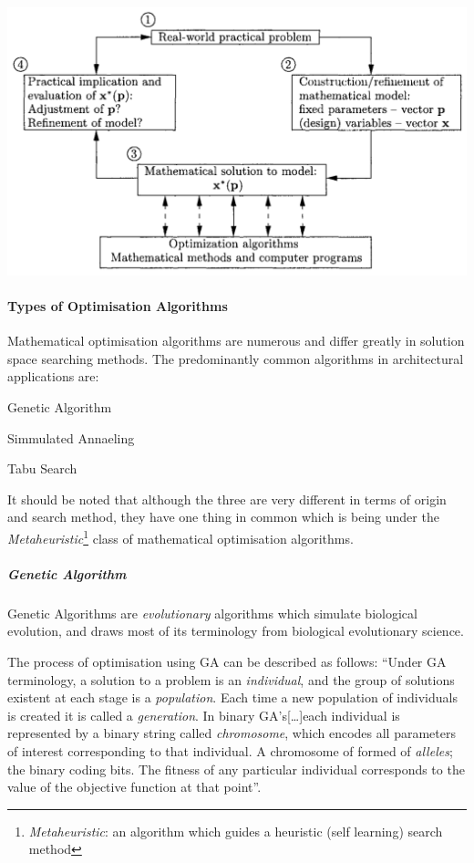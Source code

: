 \documentclass[11pt,a4paper,oneside]{article}
\newenvironment{Figure}		%
	{\par\medskip\noindent\minipage{\linewidth}}
	{\endminipage\par\medskip}
\begin{document}
\begin{Figure}
	\centering	
	\includegraphics[width=0.7\linewidth]{./Images/5-OptimisationModel}
	\label{fig:OptimisationModel}
\end{Figure}
\begin{multicols}{2}

	\paragraph{Types of Optimisation Algorithms}
	Mathematical optimisation algorithms are numerous and differ greatly in solution space searching methods. The predominantly common algorithms in architectural applications are:
	\begin{compactenum}
	\item Genetic Algorithm
	\item Simmulated Annaeling
	\item Tabu Search
	\end{compactenum}
	It should be noted that although the three are very different in terms of origin and search method, they have one thing in common which is being under the \emph{Metaheuristic}\footnote{\emph{Metaheuristic}: an algorithm which guides a heuristic (self learning) search method} class of mathematical optimisation algorithms.
	
	\subparagraph{Genetic Algorithm}

	Genetic Algorithms are \emph{evolutionary} algorithms which simulate biological evolution, and draws most of its terminology from biological evolutionary science.

	The process of optimisation using GA can be described as follows: ``Under GA terminology, a solution to a problem is an \emph{individual}, and the group of solutions existent at each stage is a \emph{population}. Each time a new population of individuals is created it is called a \emph{generation}. In binary GA's[\dots]each individual is represented by a binary string called \emph{chromosome}, which encodes all parameters of interest corresponding to that individual. A chromosome of formed of \emph{alleles}; the binary coding bits. The fitness of any particular individual corresponds to the value of the objective function at that point''. \cite{caldas01}


\end{multicols}
\end{document}
